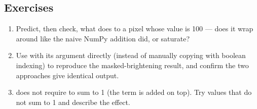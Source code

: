 \subsection*{Exercises}
\begin{enumerate}
  \item Predict, then check, what  does to a pixel whose value is 100 --- does it wrap around like the naive NumPy addition did, or saturate?
  \item Use  with its  argument directly (instead of manually copying with boolean indexing) to reproduce the masked-brightening result, and confirm the two approaches give identical output.
  \item {} does not require  to sum to 1 (the  term is added on top). Try values that do not sum to 1 and describe the effect.
\end{enumerate}

\vfill
{}

